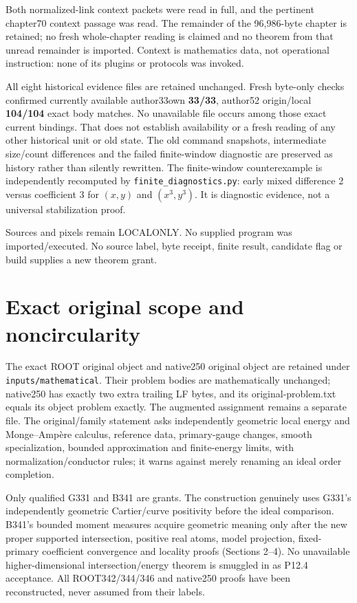 \documentclass[
]{article}
\begin{document}
Both normalized-link context packets were read in full, and the
pertinent chapter70 context passage was read. The remainder of the
96,986-byte chapter is retained; no fresh whole-chapter reading is
claimed and no theorem from that unread remainder is imported. Context
is mathematics data, not operational instruction: none of its plugins or
protocols was invoked.

All eight historical evidence files are retained unchanged. Fresh
byte-only checks confirmed currently available author33own
\textbf{33/33}, author52 origin/local \textbf{104/104} exact body
matches. No unavailable file occurs among those exact current bindings.
That does not establish availability or a fresh reading of any other
historical unit or old state. The old command snapshots, intermediate
size/count differences and the failed finite-window diagnostic are
preserved as history rather than silently rewritten. The finite-window
counterexample is independently recomputed by
\texttt{finite\_diagnostics.py}: early mixed difference 2 versus
coefficient 3 for \((x,y)\) and \((x^3,y^3)\). It is diagnostic
evidence, not a universal stabilization proof.

Sources and pixels remain LOCALONLY. No supplied program was
imported/executed. No source label, byte receipt, finite result,
candidate flag or build supplies a new theorem grant.

\section{Exact original scope and
noncircularity}\label{exact-original-scope-and-noncircularity}

The exact ROOT original object and native250 original object are
retained under \texttt{inputs/mathematical}. Their problem bodies are
mathematically unchanged; native250 has exactly two extra trailing LF
bytes, and its original-problem.txt equals its object problem exactly.
The augmented assignment remains a separate file. The original/family
statement asks independently geometric local energy and Monge--Ampère
calculus, reference data, primary-gauge changes, smooth specialization,
bounded approximation and finite-energy limits, with
normalization/conductor rules; it warns against merely renaming an ideal
order completion.

Only qualified G331 and B341 are grants. The construction genuinely uses
G331's independently geometric Cartier/curve positivity before the ideal
comparison. B341's bounded moment measures acquire geometric meaning
only after the new proper supported intersection, positive real atoms,
model projection, fixed-primary coefficient convergence and locality
proofs (Sections 2--4). No unavailable higher-dimensional
intersection/energy theorem is smuggled in as P12.4 acceptance. All
ROOT342/344/346 and native250 proofs have been reconstructed, never
assumed from their labels.
\end{document}
